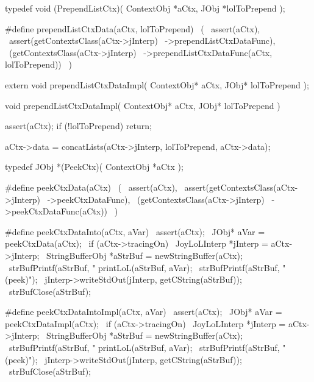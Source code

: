 \startCHeader
typedef void (PrependListCtx)(
  ContextObj *aCtx,
  JObj   *lolToPrepend
);

#define prependListCtxData(aCtx, lolToPrepend)      \
  (                                                 \
    assert(aCtx),                                   \
    assert(getContextsClass(aCtx->jInterp)          \
      ->prependListCtxDataFunc),                    \
    (getContextsClass(aCtx->jInterp)                \
      ->prependListCtxDataFunc(aCtx, lolToPrepend)) \
  )
\stopCHeader

\setCHeaderStream{private}
\startCHeader
extern void prependListCtxDataImpl(
  ContextObj* aCtx,
  JObj* lolToPrepend
);
\stopCHeader
\setCHeaderStream{public}

\startCCode
void prependListCtxDataImpl(
  ContextObj* aCtx,
  JObj* lolToPrepend
) {
  assert(aCtx);
  if (!lolToPrepend) return;

  aCtx->data =
    concatLists(aCtx->jInterp, lolToPrepend, aCtx->data);
}
\stopCCode

\startCHeader
typedef JObj *(PeekCtx)(
  ContextObj *aCtx
);

#define peekCtxData(aCtx)                   \
  (                                         \
    assert(aCtx),                           \
    assert(getContextsClass(aCtx->jInterp)  \
      ->peekCtxDataFunc),                   \
    (getContextsClass(aCtx->jInterp)        \
      ->peekCtxDataFunc(aCtx))              \
  )

#define peekCtxDataInto(aCtx, aVar)                   \
assert(aCtx);                                         \
JObj* aVar = peekCtxData(aCtx);                       \
if (aCtx->tracingOn) {                                \
  JoyLoLInterp *jInterp = aCtx->jInterp;              \
  StringBufferObj *aStrBuf = newStringBuffer(aCtx);   \
  strBufPrintf(aStrBuf, "%
  printLoL(aStrBuf, aVar);                            \
  strBufPrintf(aStrBuf, " (peek)\n");                 \
  jInterp->writeStdOut(jInterp, getCString(aStrBuf)); \
  strBufClose(aStrBuf);                               \
}

#define peekCtxDataIntoImpl(aCtx, aVar)               \
assert(aCtx);                                         \
JObj* aVar = peekCtxDataImpl(aCtx);                   \
if (aCtx->tracingOn) {                                \
  JoyLoLInterp *jInterp = aCtx->jInterp;              \
  StringBufferObj *aStrBuf = newStringBuffer(aCtx);   \
  strBufPrintf(aStrBuf, "%
  printLoL(aStrBuf, aVar);                            \
  strBufPrintf(aStrBuf, " (peek)\n");                 \
  jInterp->writeStdOut(jInterp, getCString(aStrBuf)); \
  strBufClose(aStrBuf);                               \
}
\stopCHeader

